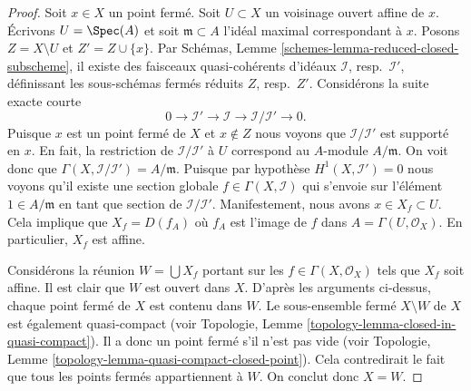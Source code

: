 \begin{proof}
Soit $x \in X$ un point fermé. Soit $U \subset X$ un voisinage ouvert affine de
$x$. Écrivons $U = \Spec(A)$ et soit $\mathfrak m \subset A$ l'idéal maximal
correspondant à $x$. Posons $Z = X \setminus U$ et $Z' = Z \cup \{x\}$. Par
Schémas, Lemme \ref{schemes-lemma-reduced-closed-subscheme}, il existe des
faisceaux quasi-cohérents d'idéaux $\mathcal{I}$, resp.\ $\mathcal{I}'$,
définissant les sous-schémas fermés réduits $Z$, resp.\ $Z'$.
Considérons la suite exacte courte
$$
0 \to \mathcal{I}' \to \mathcal{I} \to \mathcal{I}/\mathcal{I}' \to 0.
$$
Puisque $x$ est un point fermé de $X$ et $x \not \in Z$ nous voyons que
$\mathcal{I}/\mathcal{I}'$ est supporté en $x$. En fait, la restriction de
$\mathcal{I}/\mathcal{I'}$ à $U$ correspond au $A$-module $A/\mathfrak m$. On
voit donc que $\Gamma(X, \mathcal{I}/\mathcal{I'})
= A/\mathfrak m$. Puisque
par hypothèse $H^1(X, \mathcal{I}') = 0$ nous voyons qu'il existe une section
globale $f \in \Gamma(X, \mathcal{I})$ qui s'envoie sur l'élément
$1 \in A/\mathfrak m$ en tant que section de $\mathcal{I}/\mathcal{I'}$.
Manifestement,
nous avons $x \in X_f \subset U$. Cela implique que $X_f = D(f_A)$ où $f_A$ est
l'image de $f$ dans $A = \Gamma(U, \mathcal{O}_X)$. En particulier, $X_f$ est
affine.

\medskip\noindent
Considérons la réunion $W = \bigcup X_f$ portant sur les
$f \in \Gamma(X, \mathcal{O}_X)$ tels que $X_f$ soit affine. Il est clair que
$W$ est ouvert dans $X$. D'après les
arguments ci-dessus, chaque point fermé de $X$ est contenu dans $W$. Le
sous-ensemble fermé $X \setminus W$ de $X$ est également quasi-compact (voir
Topologie, Lemme \ref{topology-lemma-closed-in-quasi-compact}). Il a donc un
point fermé s'il n'est pas vide (voir Topologie, Lemme
\ref{topology-lemma-quasi-compact-closed-point}). Cela contredirait le fait que
tous les points fermés appartiennent à $W$. On conclut donc $X = W$.


\end{proof}
